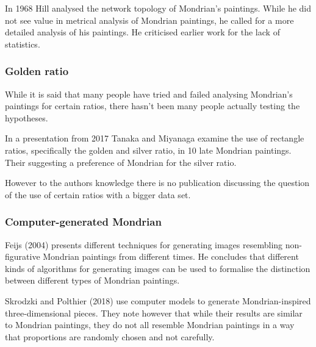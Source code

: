 
In 1968 Hill \cite{Hill1968} analysed the network topology of Mondrian's paintings.
While he did not see value in metrical analysis of Mondrian paintings, he called
for a more detailed analysis of his paintings. He criticised earlier work for
the lack of statistics.

\subsubsection{Golden ratio}

\cite{Livio2002}

While it is said that many people have tried and failed analysing Mondrian's
paintings for certain ratios, there hasn't been many people actually testing
the hypotheses.

In a presentation from 2017 Tanaka and Miyanaga \cite{Tanaka2017} examine the use
of rectangle ratios, specifically the golden and silver ratio, in 10 late
Mondrian paintings. Their suggesting a preference of Mondrian for the silver
ratio.

However to the authors knowledge there is no publication discussing the question of
the use of certain ratios with a bigger data set.

\subsubsection{Computer-generated Mondrian}



Feijs (2004)\cite{Feijs2004} presents different techniques for generating images
resembling non-figurative Mondrian paintings from different times. He  concludes
that different kinds of algorithms for generating images can be used to
formalise the distinction between different types of Mondrian paintings.


Skrodzki and Polthier (2018) \cite{Skrodzki2018} use computer models to generate
Mondrian-inspired three-dimensional pieces. They note however that while their
results are similar to Mondrian paintings, they do not all resemble Mondrian
paintings in a way that proportions are randomly chosen and not carefully.
